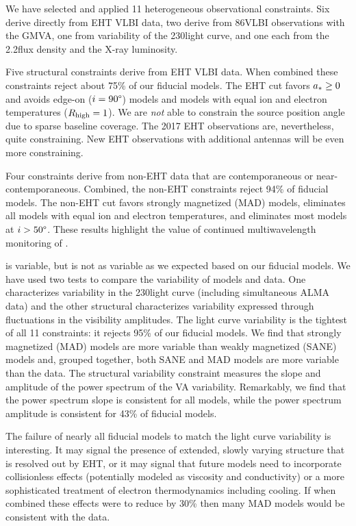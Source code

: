 We have selected and applied 11 heterogeneous observational constraints.
Six derive directly from EHT VLBI data, two derive from 86\GHz VLBI observations with the GMVA, one from variability of the 230\GHz light curve, and one each from the 2.2\um flux density and the X-ray luminosity.

Five structural constraints derive from EHT VLBI data.
When combined these constraints reject about 75\% of our fiducial models.
The EHT cut favors $a_* \ge 0$ and avoids edge-on ($i = 90\degree$) models and models with equal ion and electron temperatures ($R_\mathrm{high} = 1$).
We are {\em not} able to constrain the source position angle due to sparse baseline coverage.
The 2017 EHT observations are, nevertheless, quite constraining.  New EHT observations with additional antennas will be even more constraining.

Four constraints derive from non-EHT data that are contemporaneous or near-contemporaneous.
Combined, the non-EHT constraints reject 94\% of fiducial models.
The non-EHT cut favors strongly magnetized (MAD) models, eliminates all models with equal ion and electron temperatures, and eliminates most models at $i > 50\degree$.
These results highlight the value of continued multiwavelength monitoring of \sgra.

\sgra is variable, but is not as variable as we expected based on our fiducial models.
We have used two tests to compare the variability of models and data.
One characterizes variability in the 230\GHz light curve (including simultaneous ALMA data) and the other structural characterizes variability expressed through fluctuations in the visibility amplitudes.
The light curve variability is the tightest of all 11 constraints: it rejects 95\% of our fiducial models.
We find that strongly magnetized (MAD) models are more variable than weakly magnetized (SANE) models and, grouped together, both SANE and MAD models are more variable than the data.
The structural variability constraint measures the slope and amplitude of the power spectrum of the VA variability.
Remarkably, we find that the power spectrum slope is consistent for all models, while the power spectrum amplitude is consistent for 43\% of fiducial models.

The failure of nearly all fiducial models to match the light curve variability is interesting.
It may signal the presence of extended, slowly varying structure that is resolved out by EHT, or it may signal that future models need to incorporate collisionless effects (potentially modeled as viscosity and conductivity) or a more sophisticated treatment of electron thermodynamics including cooling.  If when combined these effects were to reduce  by 30\% then many MAD models would be consistent with the data.  

